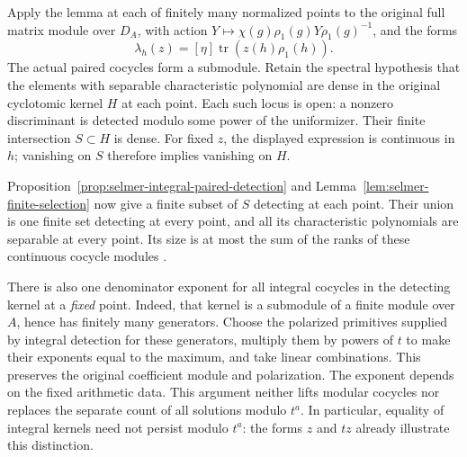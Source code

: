 Apply the lemma at each of finitely many normalized points to the
original full matrix module over $D_A$, with action
$Y\mapsto\chi(g)\rho_1(g)Y\rho_1(g)^{-1}$, and the forms
\[
                  \lambda_h(z)=[\eta]\operatorname{tr}(z(h)\rho_1(h)).
\]
The actual paired cocycles form a submodule. Retain the spectral
hypothesis that the elements with separable characteristic polynomial
are dense in the original cyclotomic kernel $H$ at each point. Each
such locus is open: a nonzero discriminant is detected modulo some
power of the uniformizer. Their finite intersection $S\subset H$ is
dense. For fixed $z$, the displayed expression is continuous in $h$;
vanishing on $S$ therefore implies vanishing on $H$.

Proposition~\ref{prop:selmer-integral-paired-detection} and
Lemma~\ref{lem:selmer-finite-selection} now give a finite subset of $S$
detecting at each point. Their union is one finite set detecting at
every point, and all its characteristic polynomials are separable at
every point. Its size is at most the sum of the ranks of these
continuous cocycle modules \cite{alpo-finite-selection}.

There is also one denominator exponent for all integral cocycles in
the detecting kernel at a \emph{fixed} point. Indeed, that kernel is a
submodule of a finite module over $A$, hence has finitely many
generators. Choose the polarized primitives supplied by integral
detection for these generators, multiply them by powers of $t$ to
make their exponents equal to the maximum, and take linear
combinations. This preserves the original coefficient module and
polarization. The exponent depends on the fixed arithmetic data.
This argument neither lifts modular cocycles nor replaces the
separate count of all solutions modulo $t^a$. In particular, equality
of integral kernels need not persist modulo $t^a$: the forms $z$ and
$tz$ already illustrate this distinction.
